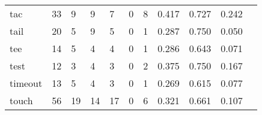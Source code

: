 \begin{longtable}{lp{1.2cm}p{1.2cm}p{1.2cm}p{1.2cm}p{1.2cm}p{1.2cm}p{1.2cm}p{1.2cm}p{1.2cm}p{1.2cm}}
tac       &                                    33 &                                                  9 &                                                  9 &                                                  7 &                                                  0 &                                                  8 &                                              0.417 &                                              0.727 &                                              0.242 \\
tail      &                                    20 &                                                  5 &                                                  9 &                                                  5 &                                                  0 &                                                  1 &                                              0.287 &                                              0.750 &                                              0.050 \\
tee       &                                    14 &                                                  5 &                                                  4 &                                                  4 &                                                  0 &                                                  1 &                                              0.286 &                                              0.643 &                                              0.071 \\
test      &                                    12 &                                                  3 &                                                  4 &                                                  3 &                                                  0 &                                                  2 &                                              0.375 &                                              0.750 &                                              0.167 \\
timeout   &                                    13 &                                                  5 &                                                  4 &                                                  3 &                                                  0 &                                                  1 &                                              0.269 &                                              0.615 &                                              0.077 \\
touch     &                                    56 &                                                 19 &                                                 14 &                                                 17 &                                                  0 &                                                  6 &                                              0.321 &                                              0.661 &                                              0.107 \\

\end{longtable}
